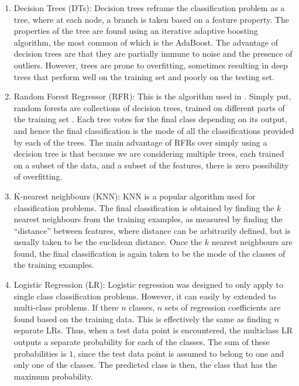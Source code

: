 \documentclass[11pt]{article}
\begin{document}
\begin{enumerate}

\item Decision Trees (DTs): Decision trees reframe the classification problem as a tree, where at each node, a branch is taken based on a feature property. The properties of the tree are found using an iterative adaptive boosting algorithm, the most common of which is the AdaBoost. The advantage of decision trees are that they are partially immune to noise and the presence of outliers. However, trees are prone to overfitting, sometimes resulting in deep trees that perform well on the training set and poorly on the testing set.

\item Random Forest Regressor (RFR):  This is the algorithm used in \cite{briggs-2012}. Simply put, random forests are collections of decision trees, trained on different parts of the training set \cite{randomForests-webLink}. Each tree votes for the final class depending on its output, and hence the final classification is the mode of all the classifications provided by each of the trees. The main advantage of RFRs over simply using a decision tree is that because we are considering multiple trees, each trained on a subset of the data, and a subset of the features, there is zero possibility of overfitting. 

\item K-nearest neighbours (KNN): KNN is a popular algorithm used for classification problems. The final classification is obtained by finding the $k$ nearest neighbours from the training examples, as measured by finding the ``distance'' between features, where distance can be arbitrarily defined, but is usually taken to be the euclidean distance. Once the $k$ nearest neighbours are found, the final classification is again taken to be the mode of the classes of the training examples.

\item Logistic Regression (LR): Logistic regression was designed to only apply to single class classification problems. However, it can easily by extended to multi-class problems. If there $n$ classes, $n$ sets of regression coefficients are found based on the training data. This is effectively the same as finding $n$ separate LRs. Thus, when a test data point is encountered, the multiclass LR outputs a separate probability for each of the classes. The sum of these probabilities is $1$, since the test data point is assumed to belong to one and only one of the classes. The predicted class is then, the class that has the maximum probability.

\end{enumerate}
\end{document}
